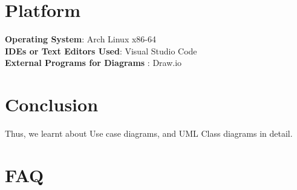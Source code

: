 \documentclass[11pt]{article}
\begin{document}
\section{Platform}
\textbf{Operating System}: Arch Linux x86-64 \\
\textbf{IDEs or Text Editors Used}: Visual Studio Code\\
\textbf{External Programs for Diagrams} : Draw.io\\


\section{Conclusion}
Thus, we learnt about Use case diagrams, and UML Class diagrams in detail.
\section{FAQ}

\clearpage
\end{document}
